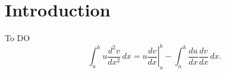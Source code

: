 \section{Introduction}
\label{intro} 
To DO
\begin{equation}
\label{eqn:drag}
	\int_a^bu\frac{d^2v}{dx^2}\,dx
	=\left.u\frac{dv}{dx}\right|_a^b
	-\int_a^b\frac{du}{dx}\frac{dv}{dx}\,dx.
\end{equation}
